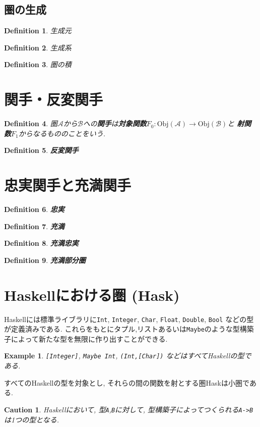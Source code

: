 \documentclass{jsbook}
\theoremstyle{plain}
\newtheorem{Def}{Definition}[chapter]
\newtheorem{caution}{Caution}[chapter]
\newtheorem{example}{Example}[chapter]
\begin{document}
\subsection{圏の生成}
\begin{Def}
生成元
\end{Def}
\begin{Def}
生成系
\end{Def}
\begin{Def}
圏の積
\end{Def}
\section{関手・反変関手}
\begin{Def}
圏$\mathscr{A}$から$\mathscr{B}$への{\bf 関手}は{\bf 対象関数}$F_0:\mathrm{Obj}(\mathscr{A})\rightarrow\mathrm{Obj}(\mathscr{B})$と
{\bf 射関数}$F_1$からなるもののことをいう.
\end{Def}
\begin{Def}
{\bf 反変関手}
\end{Def}

\section{忠実関手と充満関手}
\begin{Def}
{\bf 忠実}
\end{Def}
\begin{Def}
{\bf 充満}
\end{Def}
\begin{Def}
{\bf 充満忠実}
\end{Def}
\begin{Def}
{\bf 充満部分圏}
\end{Def}
\section{Haskellにおける圏 (Hask)}
Haskellには標準ライブラリに\verb|Int|, \verb|Integer|, 
\verb|Char|,
\verb|Float|,
\verb|Double|,
\verb|Bool|
などの型が定義済みである.
これらをもとにタプル,リストあるいは\verb|Maybe|のような型構築子によって新たな型を無限に作り出すことができる.
\begin{example}
\verb|[Integer]|, \verb|Maybe Int|,
\verb|(Int,[Char])| などはすべてHaskellの型である.
\end{example}

すべてのHaskellの型を対象とし, それらの間の関数を射とする圏Haskは小圏である.
\begin{caution}
Haskellにおいて, 型\verb|A|,\verb|B|に対して, 型構築子によってつくられる\verb|A->B|は1つの型となる.
\end{caution}
\end{document}
